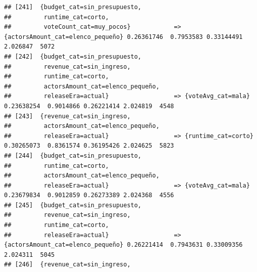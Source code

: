 \documentclass[
]{article}
\begin{document}
\begin{verbatim}
## [241]  {budget_cat=sin_presupuesto,                                                                                             
##         runtime_cat=corto,                                                                                                      
##         voteCount_cat=muy_pocos}            => {actorsAmount_cat=elenco_pequeño} 0.26361746  0.7953583 0.33144491 2.026847  5072
## [242]  {budget_cat=sin_presupuesto,                                                                                             
##         revenue_cat=sin_ingreso,                                                                                                
##         runtime_cat=corto,                                                                                                      
##         actorsAmount_cat=elenco_pequeño,                                                                                        
##         releaseEra=actual}                  => {voteAvg_cat=mala}                0.23638254  0.9014866 0.26221414 2.024819  4548
## [243]  {revenue_cat=sin_ingreso,                                                                                                
##         actorsAmount_cat=elenco_pequeño,                                                                                        
##         releaseEra=actual}                  => {runtime_cat=corto}               0.30265073  0.8361574 0.36195426 2.024625  5823
## [244]  {budget_cat=sin_presupuesto,                                                                                             
##         runtime_cat=corto,                                                                                                      
##         actorsAmount_cat=elenco_pequeño,                                                                                        
##         releaseEra=actual}                  => {voteAvg_cat=mala}                0.23679834  0.9012859 0.26273389 2.024368  4556
## [245]  {budget_cat=sin_presupuesto,                                                                                             
##         revenue_cat=sin_ingreso,                                                                                                
##         runtime_cat=corto,                                                                                                      
##         releaseEra=actual}                  => {actorsAmount_cat=elenco_pequeño} 0.26221414  0.7943631 0.33009356 2.024311  5045
## [246]  {revenue_cat=sin_ingreso,                                                                                                

\end{verbatim}
\end{document}
